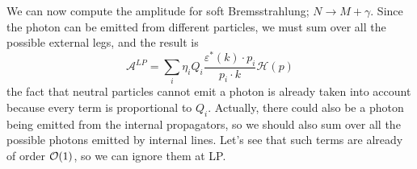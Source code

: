 \documentclass{article}
\begin{document}
%

We can now compute the amplitude for soft Bremsstrahlung; $N \to M + \gamma$.
Since the photon can be emitted from different particles,
we must sum over all the possible external legs, and the result is
\begin{equation}\label{ALP}
	\mathcal{A}^{LP}
	= \sum_i \eta_i Q_i \frac{\varepsilon^*(k) \cdot p_i}{p_i \cdot k} \mathcal{H}(p)
\end{equation}
the fact that neutral particles cannot emit a photon
is already taken into account because every term is proportional to $Q_i$.
Actually, there could also be a photon being emitted from the internal propagators,
so we should also sum over all the possible photons emitted by internal lines.
Let's see that such terms are already of order $\order{1}$, so we can ignore them at LP.
\end{document}
